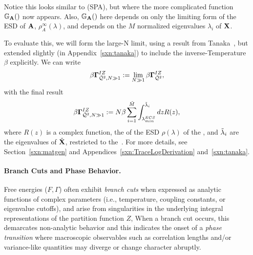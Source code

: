 Notice this looks similar to \SaddlePointApproximation (SPA), but where the more complicated function
$\mathbb{G}_{\mathbf{A}}()$ now appears.
Also, $\mathbb{G}_{\mathbf{A}}()$ here depends on only the limiting form of the ESD of $\mathbf{A}$, $\rho^{\infty}_{A}(\lambda)$,
and depends on the $M$ normalized eigenvalues $\lambda_{i}$ of $\mathbf{X}$.


To evaluate this, we will form the large-N limit, using a result from Tanaka~\cite{Tanaka2007,Tanaka2008},
but extended slightly (in Appendix~\ref{sxn:tanaka}) to include the inverse-Temperature $\beta$ explicitly.
We can write
\begin{align}
  \label{eqn:izgin_def}
  \beta\mathbf{\Gamma}^{IZ}_{\bar{\mathcal{Q}}^{2},N\gg 1}:=\lim_{N\gg 1}\beta\mathbf{\Gamma}^{IZ}_{\bar{\mathcal{Q}}^{2}} ,
\end{align}
with the final result
  \begin{align}
    \label{eqn:hciz_tanaka}
    \beta\mathbf{\Gamma}^{IZ}_{\bar{\mathcal{Q}}^{2},N\gg 1}:=N\beta\sum_{i=1}^{\tilde{M}}\int^{\tilde{\lambda}_{i}}_{\lambda^{ECS}_{min}} dz R(z) ,
\end{align}
where $R(z)$ is a complex function, the \RTransform of the ESD $\rho(\lambda)$ of the \Teacher, and $\tilde{\lambda}_{i}$ are the eigenvalues of \Teacher \CorrelationMatrix $\tilde{\mathbf{X}}$, restricted to the~\ECS.
For more details, see Section~\ref{sxn:matgen} and Appendices~\ref{sxn:TraceLogDerivation} and~\ref{sxn:tanaka}.

\paragraph{Branch Cuts and Phase Behavior.}
Free energies ($F,\Gamma$)  often exhibit \emph{branch cuts} when expressed as analytic functions 
of complex parameters (i.e., temperature, coupling constants, or eigenvalue cutoffs),
and arise from singularities in the underlying integral representations of the partition function $Z$,
When a branch cut occurs, this demarcates non-analytic behavior
and this indicates the onset of a \emph{phase transition} where
macroscopic observables such as correlation lengths and/or variance-like quantities
may diverge or change character abruptly.  

